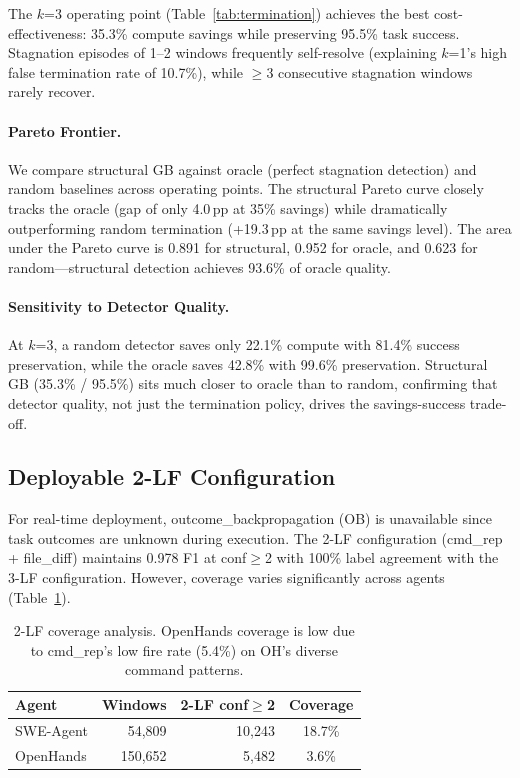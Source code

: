 \documentclass[11pt,a4paper]{article}
\begin{document}
The $k$=3 operating point (Table~\ref{tab:termination}) achieves the best cost-effectiveness: 35.3\% compute savings while preserving 95.5\% task success.
Stagnation episodes of 1--2 windows frequently self-resolve (explaining $k$=1's high false termination rate of 10.7\%), while $\geq$3 consecutive stagnation windows rarely recover.

\paragraph{Pareto Frontier.}
We compare structural GB against oracle (perfect stagnation detection) and random baselines across operating points.
The structural Pareto curve closely tracks the oracle (gap of only 4.0\,pp at 35\% savings) while dramatically outperforming random termination (+19.3\,pp at the same savings level).
The area under the Pareto curve is 0.891 for structural, 0.952 for oracle, and 0.623 for random---structural detection achieves 93.6\% of oracle quality.

\paragraph{Sensitivity to Detector Quality.}
At $k$=3, a random detector saves only 22.1\% compute with 81.4\% success preservation, while the oracle saves 42.8\% with 99.6\% preservation.
Structural GB (35.3\% / 95.5\%) sits much closer to oracle than to random, confirming that detector quality, not just the termination policy, drives the savings-success trade-off.

\subsection{Deployable 2-LF Configuration}
\label{sec:2lf}

For real-time deployment, outcome\_backpropagation (OB) is unavailable since task outcomes are unknown during execution.
The 2-LF configuration (cmd\_rep + file\_diff) maintains 0.978 F1 at conf$\geq$2 with 100\% label agreement with the 3-LF configuration.
However, coverage varies significantly across agents (Table~\ref{tab:2lf}).

\begin{table}[t]
\centering
\small
\begin{tabular}{lrrc}
\toprule
\textbf{Agent} & \textbf{Windows} & \textbf{2-LF conf$\geq$2} & \textbf{Coverage} \\
\midrule
SWE-Agent & 54{,}809 & 10{,}243 & 18.7\% \\
OpenHands & 150{,}652 & 5{,}482 & 3.6\% \\
\bottomrule
\end{tabular}
\caption{2-LF coverage analysis. OpenHands coverage is low due to cmd\_rep's low fire rate (5.4\%) on OH's diverse command patterns.}
\label{tab:2lf}
\end{table}
\end{document}
